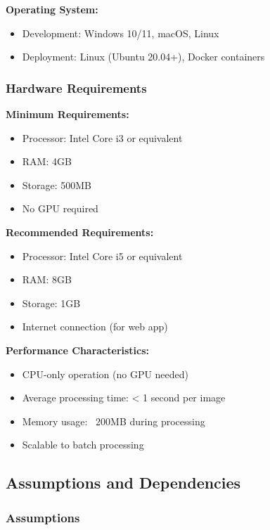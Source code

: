 \textbf{Operating System:}
\begin{itemize}
    \item Development: Windows 10/11, macOS, Linux
    \item Deployment: Linux (Ubuntu 20.04+), Docker containers
\end{itemize}

\subsubsection{Hardware Requirements}

\textbf{Minimum Requirements:}
\begin{itemize}
    \item Processor: Intel Core i3 or equivalent
    \item RAM: 4GB
    \item Storage: 500MB
    \item No GPU required
\end{itemize}

\textbf{Recommended Requirements:}
\begin{itemize}
    \item Processor: Intel Core i5 or equivalent
    \item RAM: 8GB
    \item Storage: 1GB
    \item Internet connection (for web app)
\end{itemize}

\textbf{Performance Characteristics:}
\begin{itemize}
    \item CPU-only operation (no GPU needed)
    \item Average processing time: < 1 second per image
    \item Memory usage: ~200MB during processing
    \item Scalable to batch processing
\end{itemize}

\subsection{Assumptions and Dependencies}

\subsubsection{Assumptions}

